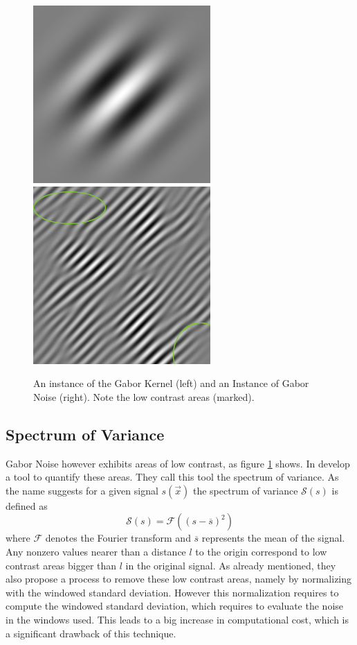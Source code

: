 \documentclass{utue} %
\begin{document}
\begin{figure}[h]
  \centering
  \includegraphics[width=0.45\linewidth]{images/gaborKernel}
  \includegraphics[width=0.45\linewidth]{images/gaborNoise}
  \caption{An instance of the Gabor Kernel (left) and an Instance of Gabor Noise (right). Note the low contrast areas (marked).}\label{fig:gaborNoise}

\end{figure}

\subsection{Spectrum of Variance}
Gabor Noise however exhibits areas of low contrast, as figure \ref{fig:gaborNoise} shows. In \cite{spectrumOfVariance} \citeauthor{spectrumOfVariance} develop a tool to quantify these areas. They call this tool the spectrum of variance. As the name suggests for a given signal $s(\vec{x})$ the spectrum of variance $\mathcal{S}(s)$ is defined as
$$
\mathcal{S}(s) = \mathcal{F}((s-\overline{s})^2)
$$
where $\mathcal{F}$ denotes the Fourier transform and $\overline{s}$ represents the mean of the signal. Any nonzero values nearer than a distance $l$ to the origin correspond to low contrast areas bigger than $l$ in the original signal. As already mentioned, they also propose a process to remove these low contrast areas, namely by normalizing with the windowed standard deviation. However this normalization requires to compute the windowed standard deviation, which requires to evaluate the noise in the windows used. This leads to a big increase in computational cost, which is a significant drawback of this technique.
\end{document}
